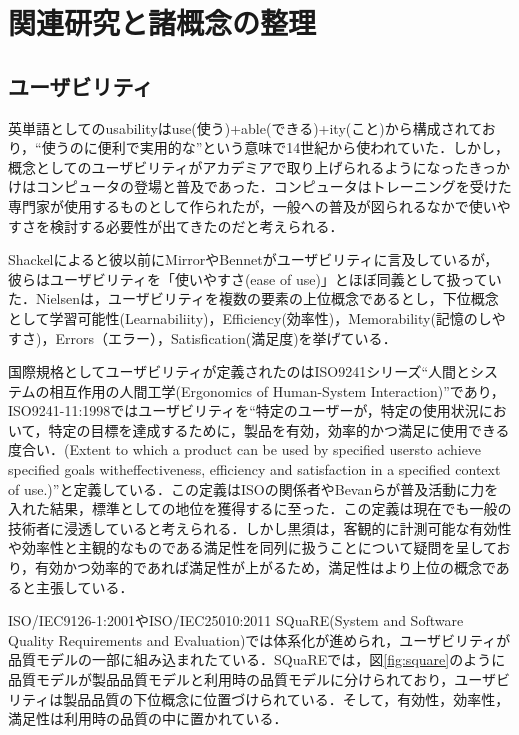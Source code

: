 \chapter{関連研究と諸概念の整理}
\label{chap:prevresearch}

\section{ユーザビリティ}

英単語としてのusabilityはuse(使う)+able(できる)+ity(こと)から構成されており，``使うのに便利で実用的な''という意味で14世紀から使われていた\cite{oed:usability}\cite{kurosu}．しかし，概念としてのユーザビリティがアカデミアで取り上げられるようになったきっかけはコンピュータの登場と普及であった\cite{kurosu}．コンピュータはトレーニングを受けた専門家が使用するものとして作られたが，一般への普及が図られるなかで使いやすさを検討する必要性が出てきたのだと考えられる．

Shackelによると彼以前にMirrorやBennetがユーザビリティに言及しているが，彼らはユーザビリティを「使いやすさ(ease of use)」とほぼ同義として扱っていた\cite{shackel1991human}\cite{kurosu}．Nielsenは，ユーザビリティを複数の要素の上位概念であるとし，下位概念として学習可能性(Learnabiliity)，Efficiency(効率性)，Memorability(記憶のしやすさ)，Errors（エラー），Satisfication(満足度)を挙げている\cite{nielsen1994}． 

国際規格としてユーザビリティが定義されたのはISO9241シリーズ``人間とシステムの相互作用の人間工学(Ergonomics of Human-System Interaction)''であり，ISO9241-11:1998ではユーザビリティを``特定のユーザーが，特定の使用状況において，特定の目標を達成するために，製品を有効，効率的かつ満足に使用できる度合い．(Extent to which a product can be used by specified usersto achieve specified goals witheffectiveness, efficiency and satisfaction in a specified context of use.)''と定義している．この定義はISOの関係者やBevanらが普及活動に力を入れた結果，標準としての地位を獲得するに至った\cite{kurosu}．この定義は現在でも一般の技術者に浸透していると考えられる．しかし黒須は，客観的に計測可能な有効性や効率性と主観的なものである満足性を同列に扱うことについて疑問を呈しており，有効かつ効率的であれば満足性が上がるため，満足性はより上位の概念であると主張している\cite{kurosu}．

ISO/IEC9126-1:2001やISO/IEC25010:2011 SQuaRE(System and Software Quality Requirements and Evaluation)では体系化が進められ，ユーザビリティが品質モデルの一部に組み込まれたている．SQuaREでは，図\ref{fig:square}のように品質モデルが製品品質モデルと利用時の品質モデルに分けられており，ユーザビリティは製品品質の下位概念に位置づけられている．そして，有効性，効率性，満足性は利用時の品質の中に置かれている．

